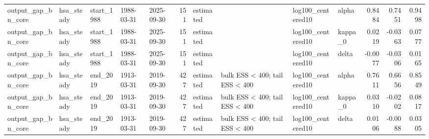 \begin{tabular}{lllllrllllrrr}
output\_gap\_bn\_core & hsa\_steady & start\_1988 & 1988-03-31 & 2025-09-30 & 151 & estimated &  & log100\_centered10 & alpha & 0.8484 & 0.7451 & 0.9498 \\
output\_gap\_bn\_core & hsa\_steady & start\_1988 & 1988-03-31 & 2025-09-30 & 151 & estimated &  & log100\_centered10 & kappa\_0 & 0.0219 & -0.0363 & 0.0777 \\
output\_gap\_bn\_core & hsa\_steady & start\_1988 & 1988-03-31 & 2025-09-30 & 151 & estimated &  & log100\_centered10 & delta & -0.0077 & -0.0306 & 0.0165 \\
output\_gap\_bn\_core & hsa\_steady & end\_2019 & 1913-03-31 & 2019-09-30 & 427 & estimated & bulk ESS < 400; tail ESS < 400 & log100\_centered10 & alpha & 0.7611 & 0.6656 & 0.8549 \\
output\_gap\_bn\_core & hsa\_steady & end\_2019 & 1913-03-31 & 2019-09-30 & 427 & estimated & bulk ESS < 400; tail ESS < 400 & log100\_centered10 & kappa\_0 & 0.0310 & -0.0202 & 0.0817 \\
output\_gap\_bn\_core & hsa\_steady & end\_2019 & 1913-03-31 & 2019-09-30 & 427 & estimated & bulk ESS < 400; tail ESS < 400 & log100\_centered10 & delta & 0.0106 & -0.0088 & 0.0305 \\
\bottomrule
\end{tabular}
